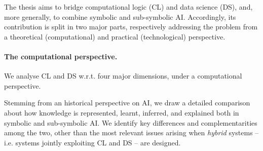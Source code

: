 \documentclass[12pt]{scrartcl}
\begin{document}
%
%
%
%

The thesis aims to bridge computational logic (CL) and data science (DS), and, more generally, to combine symbolic and sub-symbolic AI.
%
Accordingly, its contribution is split in two major parts, respectively addressing the problem from a theoretical (computational) and practical (technological) perspective.

\paragraph{The computational perspective.}

We analyse CL and DS w.r.t. four major dimensions, under a computational perspective. %

Stemming from an historical perspective on AI, we draw a detailed comparison about how knowledge is represented, learnt, inferred, and explained both in symbolic and sub-symbolic AI.
%
We identify key differences and complementarities among the two, other than the most relevant issues arising when \emph{hybrid} systems -- i.e. systems jointly exploiting CL and DS -- are designed.
\end{document}
